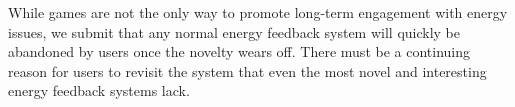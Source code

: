 \documentclass[10pt, conference, compsocconf]{IEEEtran}
\begin{document}

While games are not the only way to promote long-term engagement with energy issues, we submit that any normal energy feedback system will quickly be abandoned by users once the novelty wears off. There must be a continuing reason for users to revisit the system that even the most novel and interesting energy feedback systems lack.
\end{document}
